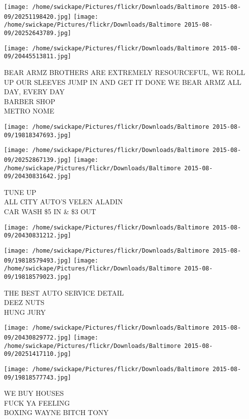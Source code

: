 \documentclass[10pt,letterpaper]{article}
\begin{document}
\texttt{[image: /home/swickape/Pictures/flickr/Downloads/Baltimore 2015-08-09/20251198420.jpg]}
\texttt{[image: /home/swickape/Pictures/flickr/Downloads/Baltimore 2015-08-09/20252643789.jpg]}

\vspace{0.25in}
\texttt{[image: /home/swickape/Pictures/flickr/Downloads/Baltimore 2015-08-09/20445513811.jpg]}

BEAR ARMZ BROTHERS ARE EXTREMELY RESOURCEFUL, WE ROLL UP OUR SLEEVES JUMP IN AND GET IT DONE WE BEAR ARMZ ALL DAY, EVERY DAY\\
BARBER SHOP\\
METRO NOME
\pagebreak

\texttt{[image: /home/swickape/Pictures/flickr/Downloads/Baltimore 2015-08-09/19818347693.jpg]}

\vspace{0.25in}
\texttt{[image: /home/swickape/Pictures/flickr/Downloads/Baltimore 2015-08-09/20252867139.jpg]}
\texttt{[image: /home/swickape/Pictures/flickr/Downloads/Baltimore 2015-08-09/20430831642.jpg]}

TUNE UP\\
ALL CITY AUTO'S VELEN ALADIN\\
CAR WASH \$5 IN \& \$3 OUT
\pagebreak

\texttt{[image: /home/swickape/Pictures/flickr/Downloads/Baltimore 2015-08-09/20430831212.jpg]}

\vspace{0.25in}
\texttt{[image: /home/swickape/Pictures/flickr/Downloads/Baltimore 2015-08-09/19818579493.jpg]}
\texttt{[image: /home/swickape/Pictures/flickr/Downloads/Baltimore 2015-08-09/19818579023.jpg]}

THE BEST AUTO SERVICE DETAIL\\
DEEZ NUTS\\
HUNG JURY
\pagebreak

\texttt{[image: /home/swickape/Pictures/flickr/Downloads/Baltimore 2015-08-09/20430829772.jpg]}
\texttt{[image: /home/swickape/Pictures/flickr/Downloads/Baltimore 2015-08-09/20251417110.jpg]}

\texttt{[image: /home/swickape/Pictures/flickr/Downloads/Baltimore 2015-08-09/19818577743.jpg]}

WE BUY HOUSES\\
FUCK YA FEELING\\
BOXING WAYNE BITCH TONY
\pagebreak
\end{document}
